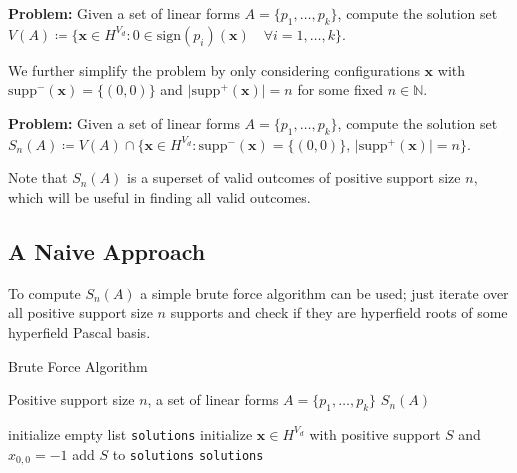 \textbf{Problem:} Given a set of linear forms $A = \{ p_{1}, \dots, p_{k} \}$, compute the solution set $V(A) \coloneqq \{ \mathbf{x} \in H^{V_{d}} : 0 \in \mathrm{sign}(p_{i})(\mathbf{x})  \quad \forall i = 1, \dots, k \}$.

\vspace{0.3cm}

We further simplify the problem by only considering configurations $\mathbf{x}$ with $\mathrm{supp}^-(\mathbf{x}) = \{ (0,0) \}$ and $\vert \mathrm{supp}^+(\mathbf{x}) \vert = n$ for some fixed $n \in \mathbb N$.

\vspace{0.3cm}

\noindent \textbf{Problem:} Given a set of linear forms $A = \{ p_{1}, \dots, p_{k} \}$, compute the solution set $S_{n}(A) \coloneqq V(A) \cap \{ \mathbf{x} \in H^{V_{d}} : \text{$\mathrm{supp}^-(\mathbf{x}) = \{ (0,0) \}$, $\vert \mathrm{supp}^+(\mathbf{x}) \vert = n$} \}$.

\vspace{0.3cm}

Note that $S_{n}(A)$ is a superset of valid outcomes of positive support size $n$, which will be useful in finding all valid outcomes.

\subsection*{A Naive Approach}

To compute $S_{n}(A)$ a simple brute force algorithm can be used; just iterate over all positive support size $n$ supports and check if they are hyperfield roots of some hyperfield Pascal basis.


\begin{algorithm}
\caption{Brute Force Algorithm}\label{alg:hyperfield_criterion:brute_force}
    \begin{algorithmic}[1]
    \Require Positive support size $n$, a set of linear forms $A = \{ p_{1}, \dots, p_{k} \}$
    \Ensure $S_{n}(A)$

    \State initialize empty list \texttt{solutions}
        \State initialize $\mathbf{x} \in H^{V_{d}}$ with positive support $S$ and $x_{0,0} = -1$ 
        \State add $S$ to \texttt{solutions}
        \EndIf
    \EndFor
    \State \Return \texttt{solutions}
    \EndFunction
    \end{algorithmic}  
\end{algorithm}
    
